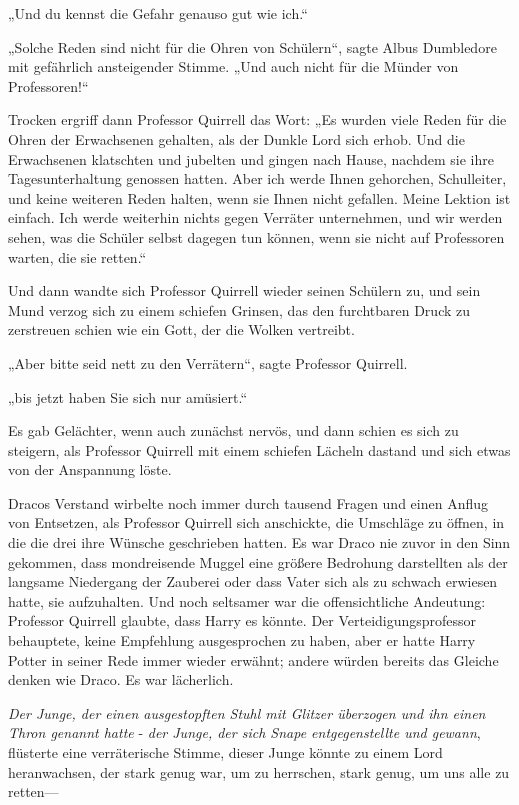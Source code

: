 {„Und du kennst die Gefahr genauso gut wie ich.“

„Solche Reden sind nicht für die Ohren von Schülern“, sagte Albus Dumbledore mit gefährlich ansteigender Stimme. „Und auch nicht für die Münder von Professoren!“

Trocken ergriff dann Professor Quirrell das Wort: „Es wurden viele Reden für die Ohren der Erwachsenen gehalten, als der Dunkle Lord sich erhob. Und die Erwachsenen klatschten und jubelten und gingen nach Hause, nachdem sie ihre Tagesunterhaltung genossen hatten. Aber ich werde Ihnen gehorchen, Schulleiter, und keine weiteren Reden halten, wenn sie Ihnen nicht gefallen. Meine Lektion ist einfach. Ich werde weiterhin nichts gegen Verräter unternehmen, und wir werden sehen, was die Schüler selbst dagegen tun können, wenn sie nicht auf Professoren warten, die sie retten.“

Und dann wandte sich Professor Quirrell wieder seinen Schülern zu, und sein Mund verzog sich zu einem schiefen Grinsen, das den furchtbaren Druck zu zerstreuen schien wie ein Gott, der die Wolken vertreibt.

„Aber bitte seid nett zu den Verrätern“, sagte Professor Quirrell.

„bis jetzt haben Sie sich nur amüsiert.“

Es gab Gelächter, wenn auch zunächst nervös, und dann schien es sich zu steigern, als Professor Quirrell mit einem schiefen Lächeln dastand und sich etwas von der Anspannung löste.

Dracos Verstand wirbelte noch immer durch tausend Fragen und einen Anflug von Entsetzen, als Professor Quirrell sich anschickte, die Umschläge zu öffnen, in die die drei ihre Wünsche geschrieben hatten. Es war Draco nie zuvor in den Sinn gekommen, dass mondreisende Muggel eine größere Bedrohung darstellten als der langsame Niedergang der Zauberei oder dass Vater sich als zu schwach erwiesen hatte, sie aufzuhalten. Und noch seltsamer war die offensichtliche Andeutung: Professor Quirrell glaubte, dass Harry es könnte. Der Verteidigungsprofessor behauptete, keine Empfehlung ausgesprochen zu haben, aber er hatte Harry Potter in seiner Rede immer wieder erwähnt; andere würden bereits das Gleiche denken wie Draco. Es war lächerlich.

\emph{Der Junge, der einen ausgestopften Stuhl mit Glitzer überzogen und ihn einen Thron genannt hatte} - \emph{der Junge, der sich Snape entgegenstellte und gewann}, flüsterte eine verräterische Stimme, dieser Junge könnte zu einem Lord heranwachsen, der stark genug war, um zu herrschen, stark genug, um uns alle zu retten—

}
